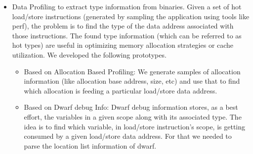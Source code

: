 \documentclass[9pt]{article}
\newenvironment{changemargin}[2]{%
  \begin{list}{}{%
    \setlength{\topsep}{0pt}%
    \setlength{\leftmargin}{#1}%
    \setlength{\rightmargin}{#2}%
    \setlength{\listparindent}{\parindent}%
    \setlength{\itemindent}{\parindent}%
    \setlength{\parsep}{\parskip}%
  }%
  \item[]}{\end{list}
}
\newenvironment{body} {
	\vspace*{-16pt}
	\begin{changemargin}{-0.25in}{-0.5in}
  }	
	{\end{changemargin}
}
\begin{document}
\begin{body}
\begin{itemize}
\begin{itemize}
			\end{itemize}


                \item Data Profiling to extract type information from binaries.
                Given a set of hot load/store instructions (generated by
                    sampling the application using tools like perf), the
                problem is to find the type of the data address associated with
                those instructions. The found type information (which can be
                    referred to as hot types) are useful in optimizing memory
                allocation strategies or cache utilization. We developed the
                following prototypes.

			\begin{itemize}

                          \item Based on Allocation Based Profiling: We
                          generate samples of allocation information (like
                              allocation base address, size, etc) and use that
                          to find which allocation is feeding a particular
                          load/store data address.

                          \item Based on Dwarf debug Info: Dwarf debug
                          information stores, as a best effort, the variables
                          in a given scope along with its associated type. The
                          idea is to find which variable, in load/store
                          instruction's scope, is getting consumed by a given
                          load/store data address. For that we needed to parse
                          the location list information of dwarf.

			\end{itemize}

	\end{itemize}


\end{body}
\end{document}
